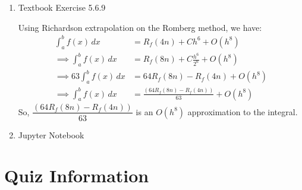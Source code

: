 \documentclass[reqno, answers]{exam}
\begin{document}
\begin{enumerate}
\begin{solution}
              Substitute and combine terms:
              \begin{align*}
                  S_f(n) & = \frac{4}{3} \cdot \frac{h}{2} \left[ f(t_0) + 2\sum_{i=1}^{2n-1} f(t_i) + f(t_{2n}) \right] - \frac{1}{3} h \left[ f(t_0) + 2\sum_{j=1}^{n-1} f(t_{2j}) + f(t_{2n}) \right] \\
                         & = \frac{h}{3} \left[ f(t_0) + 4\sum_{j=1}^{n} f(t_{2j-1}) + 2\sum_{j=1}^{n-1} f(t_{2j}) + f(t_{2n}) \right]
              \end{align*}

              This is the standard composite Simpson's rule.
              \[
                  S_f(n) = \frac{h}{3} \left[ f(t_0) + 4f(t_1) + 2f(t_2) + \cdots + 4f(t_{2n-1}) + f(t_{2n}) \right]
              \]
          \end{solution}

    \item Textbook Exercise 5.6.9
          \begin{solution}
              Using Richardson extrapolation on the Romberg method, we have:
              \begin{align*}
                  \int_{a}^{b} f(x) \, dx   & = R_f(4n) + Ch^6 + O\left(h^8\right)                                  \\
                  \implies
                  \int_{a}^{b} f(x) \, dx   & = R_f(8n) + C\frac{h^6}{2^6} + O\left(h^8\right)                      \\
                  \implies
                  63\int_{a}^{b} f(x) \, dx & = 64 R_f(8n) - R_f(4n) + O\left(h^8\right)                            \\
                  \implies
                  \int_{a}^{b} f(x) \, dx   & = \frac{\left( 64 R_f(8n) - R_f(4n) \right)}{63}  + O\left(h^8\right)
              \end{align*}
              So,
              $\dfrac{\left( 64 R_f(8n) - R_f(4n) \right)}{63}$ is an $O(h^8)$ approximation to the integral.
          \end{solution}

    \item Jupyter Notebook

\end{enumerate}


\section*{Quiz Information}
\end{document}
